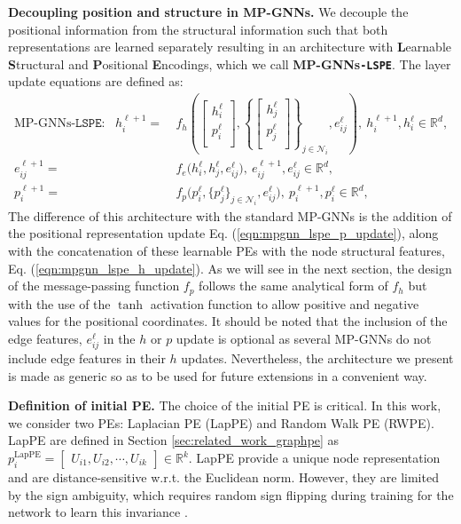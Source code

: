 \documentclass{article} \usepackage{iclr2021_conference,times}
\begin{document}
{\bf Decoupling position and structure in MP-GNNs.} We decouple the positional information from the structural information such that both representations are learned separately resulting in an architecture with \textbf{L}earnable \textbf{S}tructural and \textbf{P}ositional \textbf{E}ncodings, which we call \textbf{MP-GNNs\texttt{-LSPE}}. The layer update equations are defined as:
\vspace{-12pt}
\begin{align}
    \text{MP-GNNs}\texttt{-LSPE}: \ \ \  h_i^{\ell+1} =& \ f_{h} \left(
    \left[\!\!\begin{array}{c} h_i^{\ell} \\ p_i^{\ell} \\ \end{array}\!\!\right],
    \left\{\!
    \left[\!\!\begin{array}{c} h_j^{\ell} \\ p_j^{\ell} \\ \end{array}\!\!\right]
\!\right\}_{j \in \mathcal{N}_i}, e_{ij}^{\ell} \right), \ h_i^{\ell+1},h_i^{\ell}\in\mathbb{R}^{d},\label{eqn:mpgnn_lspe_h_update}\\
    e_{ij}^{\ell+1} =& \ f_{e} \Big( h_i^{\ell}, h_j^{\ell}, e_{ij}^{\ell}\Big), \ e_{ij}^{\ell+1},e_{ij}^{\ell}\in\mathbb{R}^{d},\label{eqn:mpgnn_lspe_e_update}\\
    p_i^{\ell+1} =& \ f_p \Big( p_i^{\ell}, \big\{ p_j^{\ell} \big\}_{j \in \mathcal{N}_i}, e_{ij}^{\ell}\Big),\ p_i^{\ell+1},p_i^{\ell}\in\mathbb{R}^{d},\label{eqn:mpgnn_lspe_p_update}
\end{align}
The difference of this architecture with the standard MP-GNNs is the addition of the positional representation update Eq. (\ref{eqn:mpgnn_lspe_p_update}), along with the concatenation of these learnable PEs with the node structural features, Eq. (\ref{eqn:mpgnn_lspe_h_update}). As we will see in the next section, the design of the message-passing function $f_p$ follows the same analytical form of $f_h$ but with the use of the $\tanh$ activation function to allow positive and negative values for the positional coordinates. It should be noted that the inclusion of the edge features, $e_{ij}^{\ell}$ in the $h$ or $p$ update is optional as several MP-GNNs do not include edge features in their $h$ updates. Nevertheless, the architecture we present is made as generic so as to be used for future extensions in a convenient way.


{\bf Definition of initial PE.}
The choice of the initial PE
is critical. In this work, we consider two PEs: Laplacian PE (LapPE) and Random Walk PE (RWPE). 
LapPE are defined in Section \ref{sec:related_work_graphpe} as $p^\textrm{LapPE}_i = \left[ \begin{array}{c} U_{i1}, U_{i2}, \cdots, U_{ik} \end{array} \right]\in\mathbb{R}^{k}.$
LapPE provide a unique node representation and are distance-sensitive w.r.t. the Euclidean norm. However, they are limited by the sign ambiguity, which requires random sign flipping during training for the network to learn this invariance \citep{dwivedi2020benchmarking}. 
\end{document}
